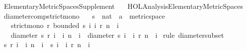 %
\begin{isabellebody}%
%
%
\isadelimtheory
%
\endisadelimtheory
%
\isatagtheory
{}\isamarkupfalse%
\ Elementary{\isacharunderscore}{\kern0pt}Metric{\isacharunderscore}{\kern0pt}Spaces{\isacharunderscore}{\kern0pt}Supplement\isanewline
\ \ \ {\isachardoublequoteopen}HOL{\isacharminus}{\kern0pt}Analysis{\isachardot}{\kern0pt}Elementary{\isacharunderscore}{\kern0pt}Metric{\isacharunderscore}{\kern0pt}Spaces{\isachardoublequoteclose}\isanewline
{}%
\endisatagtheory
{\isafoldtheory}%
%
\isadelimtheory
%
\endisadelimtheory
%
\isadelimdocument
%
\endisadelimdocument
%
\isatagdocument
%
\isamarkuptrue%
%
\endisatagdocument
{\isafolddocument}%
%
\isadelimdocument
%
\endisadelimdocument
{}\isamarkupfalse%
\ diameter{\isacharunderscore}{\kern0pt}comp{\isacharunderscore}{\kern0pt}strict{\isacharunderscore}{\kern0pt}mono{\isacharcolon}{\kern0pt}\isanewline
\ \ \ s\ {\isacharcolon}{\kern0pt}{\isacharcolon}{\kern0pt}\ {\isachardoublequoteopen}nat\ {\isasymRightarrow}\ {\isacharprime}{\kern0pt}a\ {\isacharcolon}{\kern0pt}{\isacharcolon}{\kern0pt}\ metric{\isacharunderscore}{\kern0pt}space{\isachardoublequoteclose}\isanewline
\ \ \ {\isachardoublequoteopen}strict{\isacharunderscore}{\kern0pt}mono\ r{\isachardoublequoteclose}\ {\isachardoublequoteopen}bounded\ {\isacharbraceleft}{\kern0pt}s\ i\ {\isacharbar}{\kern0pt}i{\isachardot}{\kern0pt}\ r\ n\ {\isasymle}\ i{\isacharbraceright}{\kern0pt}{\isachardoublequoteclose}\isanewline
\ \ \ {\isachardoublequoteopen}diameter\ {\isacharbraceleft}{\kern0pt}s\ {\isacharparenleft}{\kern0pt}r\ i{\isacharparenright}{\kern0pt}\ {\isacharbar}{\kern0pt}\ i{\isachardot}{\kern0pt}\ n\ {\isasymle}\ i{\isacharbraceright}{\kern0pt}\ {\isasymle}\ diameter\ {\isacharbraceleft}{\kern0pt}s\ i\ {\isacharbar}{\kern0pt}\ i{\isachardot}{\kern0pt}\ r\ n\ {\isasymle}\ i{\isacharbraceright}{\kern0pt}{\isachardoublequoteclose}\isanewline
%
\isadelimproof
%
\endisadelimproof
%
\isatagproof
{}\isamarkupfalse%
\ {\isacharparenleft}{\kern0pt}rule\ diameter{\isacharunderscore}{\kern0pt}subset{\isacharparenright}{\kern0pt}\isanewline
\ \ \isamarkupfalse%
\ {\isachardoublequoteopen}{\isacharbraceleft}{\kern0pt}s\ {\isacharparenleft}{\kern0pt}r\ i{\isacharparenright}{\kern0pt}\ {\isacharbar}{\kern0pt}\ i{\isachardot}{\kern0pt}\ n\ {\isasymle}\ i{\isacharbraceright}{\kern0pt}\ {\isasymsubseteq}\ {\isacharbraceleft}{\kern0pt}s\ i\ {\isacharbar}{\kern0pt}\ i{\isachardot}{\kern0pt}\ r\ n\ {\isasymle}\ i{\isacharbraceright}{\kern0pt}{\isachardoublequoteclose}\ \isamarkupfalse%

\end{isabellebody}
